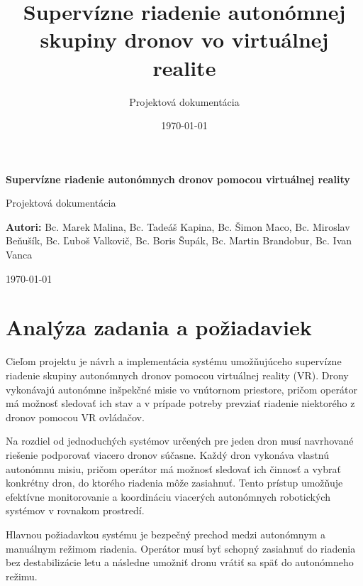 \documentclass[a4paper,12pt]{article}
\title{Supervízne riadenie autonómnej skupiny dronov vo virtuálnej realite}
\author{Projektová dokumentácia}
\date{\today}
\begin{document}
\begin{titlepage}
\centering

\vspace*{3cm}

{\LARGE \textbf{Supervízne riadenie autonómnych dronov pomocou virtuálnej reality}}

\vspace{1.5cm}

{\Large Projektová dokumentácia}

\vspace{2cm}

\textbf{Autori:} Bc. Marek Malina, Bc. Tadeáš Kapina, Bc. Šimon Maco, Bc. Miroslav Beňušík, Bc. Ľuboš Valkovič, Bc. Boris Šupák, Bc. Martin Brandobur, Bc. Ivan Vanca

\vfill

\today

\end{titlepage}

\tableofcontents
\newpage

\section{Analýza zadania a požiadaviek}

Cieľom projektu je návrh a implementácia systému umožňujúceho supervízne riadenie skupiny autonómnych dronov pomocou virtuálnej reality (VR). 
Drony vykonávajú autonómne inšpekčné misie vo vnútornom priestore, pričom operátor má možnosť sledovať ich stav a v prípade potreby 
prevziať riadenie niektorého z dronov pomocou VR ovládačov.

Na rozdiel od jednoduchých systémov určených pre jeden dron musí navrhované riešenie podporovať viacero dronov súčasne. 
Každý dron vykonáva vlastnú autonómnu misiu, pričom operátor má možnosť sledovať ich činnosť a vybrať konkrétny dron, 
do ktorého riadenia môže zasiahnuť. Tento prístup umožňuje efektívne monitorovanie a koordináciu viacerých autonómnych 
robotických systémov v rovnakom prostredí.

Hlavnou požiadavkou systému je bezpečný prechod medzi autonómnym a manuálnym režimom riadenia. 
Operátor musí byť schopný zasiahnuť do riadenia bez destabilizácie letu a následne umožniť dronu 
vrátiť sa späť do autonómneho režimu.
\\
\end{document}
